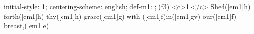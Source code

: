 initial-style: 1;
centering-scheme: english;
def-m1: \grealign;
(f3) <c>1.</c> Shed([em1]h) forth([em1]h) thy([em1]h) grace([em1]g) with-([em1]f)in([em1]gv) our([em1]f) breast,([em1]e)